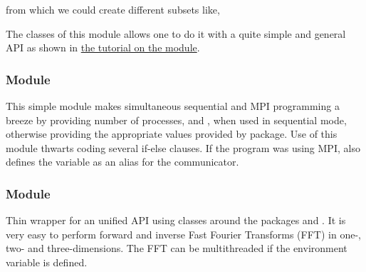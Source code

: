 \documentclass{../jors}
\begin{document}

from which we could create different subsets like,


The classes of this module allows one to do it with a quite simple and general
API as shown in
\href{http://fluiddyn.readthedocs.io/en/latest/ipynb/tuto_serieofarrays.html}{%
the tutorial on the module}.

\subsubsection*{Module }

This simple module makes simultaneous sequential and MPI programming a breeze
by providing number of processes,  and , when used in sequential mode, otherwise providing the appropriate values
provided by  package. Use of this module thwarts coding several if-else
clauses. If the program was using MPI, also defines the variable
 as an alias for the  communicator.

\subsubsection*{Module }

Thin wrapper for an unified API using classes around the packages 
and .  It is very easy to perform forward and inverse Fast
Fourier Transforms (FFT) in one-, two- and three-dimensions.
The FFT can be multithreaded if the environment variable
 is defined.
\end{document}
